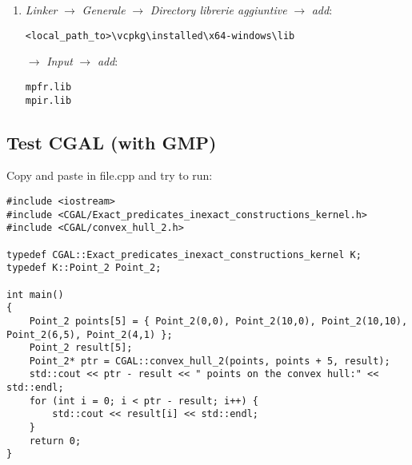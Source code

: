 \documentclass[11pt, english, openany]{report}
\begin{document}
\begin{appendices}
\begin{enumerate}
\item \textit{Linker} $\rightarrow$ \textit{Generale} $\rightarrow$ \textit{Directory librerie aggiuntive} $\rightarrow$ \textit{add}:

\begin{lstlisting}
<local_path_to>\vcpkg\installed\x64-windows\lib
\end{lstlisting}

	 $\rightarrow$ \textit{Input} $\rightarrow$ \textit{add}:
\begin{lstlisting}
mpfr.lib
mpir.lib	
\end{lstlisting}
\end{enumerate}
	
\subsection{Test CGAL (with GMP)}
Copy and paste in file.cpp and try to run:

\begin{lstlisting}
#include <iostream>
#include <CGAL/Exact_predicates_inexact_constructions_kernel.h>
#include <CGAL/convex_hull_2.h>

typedef CGAL::Exact_predicates_inexact_constructions_kernel K;
typedef K::Point_2 Point_2;
    
int main()
{
	Point_2 points[5] = { Point_2(0,0), Point_2(10,0), Point_2(10,10), Point_2(6,5), Point_2(4,1) };
	Point_2 result[5];
	Point_2* ptr = CGAL::convex_hull_2(points, points + 5, result);
	std::cout << ptr - result << " points on the convex hull:" << std::endl;
	for (int i = 0; i < ptr - result; i++) {
		std::cout << result[i] << std::endl;
	}
	return 0;
}
\end{lstlisting}


\end{appendices}
\end{document}
